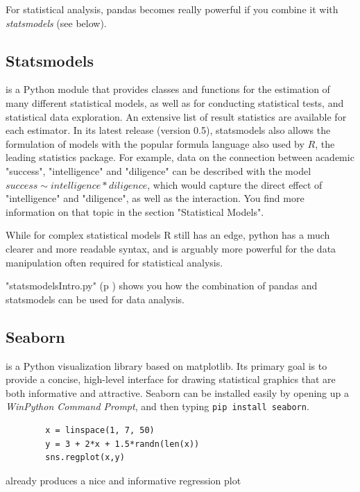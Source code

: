For statistical analysis, pandas becomes really powerful if you combine it with \emph{statsmodels} (see below).


\subsection{Statsmodels}

\cite{statsmodels} is a Python module that provides classes and functions for the estimation of many different statistical models, as well as for conducting statistical tests, and statistical data exploration. An extensive list of result statistics are available for each estimator. In its latest release (version 0.5), statsmodels also allows the formulation of models with the popular formula language also used by $R$, the leading statistics package. For example, data on the connection between academic "success", "intelligence" and "diligence" can be described with the model
$success \sim intelligence * diligence$, which would capture the direct effect of "intelligence" and "diligence", as well as the interaction. You find more information on that topic in the section "Statistical Models".

While for complex statistical models R still has an edge, python has a much clearer and more readable syntax, and is arguably more powerful for the data manipulation often required for statistical analysis.

\PyImg "statsmodelsIntro.py" (p \pageref{py:statsmodelsIntro}) shows you how the combination of pandas and statsmodels can be used for data analysis.

\subsection{Seaborn}

\cite{seaborn} is a Python visualization library based on matplotlib. Its primary goal is to provide a concise, high-level interface for drawing statistical graphics that are both informative and attractive. Seaborn can be installed easily by opening up a \emph{WinPython Command Prompt}, and then typing \lstinline{pip install seaborn}.

\begin{lstlisting}
        x = linspace(1, 7, 50)
        y = 3 + 2*x + 1.5*randn(len(x))
        sns.regplot(x,y)
\end{lstlisting}

already produces a nice and informative regression plot

